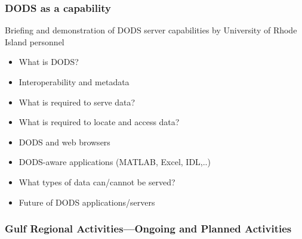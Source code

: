 \subsubsection{DODS as a capability}

   Briefing and demonstration of DODS server capabilities by University of Rhode Island 
personnel
\begin{itemize}
\item What is DODS?
\item                 Interoperability and metadata
\item                 What is required to serve data?
\item                 What is required to locate and access data?
\item                 DODS and web browsers
\item                 DODS-aware applications (MATLAB, Excel, IDL,..)
\item                 What types of data can/cannot be served?
\item                 Future of DODS applications/servers
\end{itemize}

\subsubsection{Gulf Regional Activities---Ongoing and Planned Activities}

